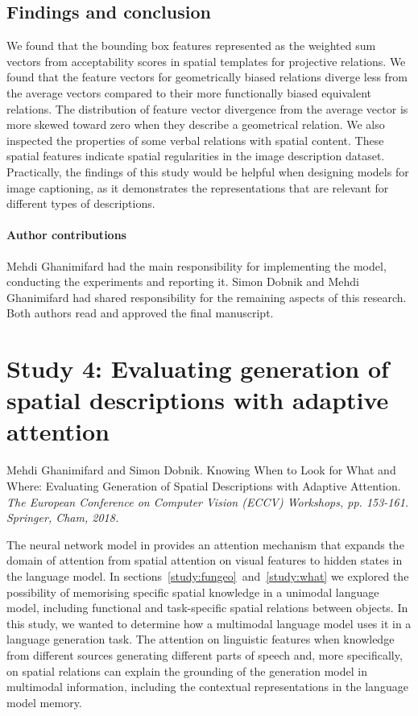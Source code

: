 \subsection{Findings and conclusion}
We found that the bounding box features %
represented as the
weighted sum vectors from acceptability scores in spatial templates for projective relations. 
We found that the feature vectors for geometrically biased relations diverge less from the average vectors compared to their more functionally biased equivalent relations. 
The distribution of feature vector divergence from the average vector is more skewed toward zero when they describe a geometrical relation. 
We also inspected the properties of some verbal relations with spatial content. 
These spatial features indicate spatial regularities in the image description dataset.
Practically, the findings of this study would be helpful when designing models for image captioning, as it demonstrates the representations that are relevant for different types of descriptions.

\paragraph{Author contributions}
Mehdi Ghanimifard had the main responsibility for implementing the model, conducting the experiments and reporting it. Simon Dobnik and Mehdi Ghanimifard had shared responsibility for the remaining aspects of this research. Both authors read and approved the final manuscript.

\section{Study 4: Evaluating generation of spatial descriptions with adaptive attention}
\label{study:knowing}
Mehdi Ghanimifard and Simon Dobnik. 
Knowing When to Look for What and Where: Evaluating Generation of Spatial Descriptions with Adaptive Attention.
\textit{The European Conference on Computer Vision (ECCV) Workshops, pp. 153-161. Springer, Cham, 2018.}

The neural network model in \citep{lu2017knowing} provides an attention mechanism that expands the domain of attention from spatial attention on visual features to hidden states in the language model. 
In sections~\ref{study:fungeo}~and~\ref{study:what} we explored the possibility of memorising specific spatial knowledge in a unimodal language model, including functional and task-specific spatial relations between objects. 
In this study, we wanted to determine how a multimodal language model uses it in a language generation task. 
The attention on linguistic features when knowledge from different sources generating different parts of speech and,
more specifically, on spatial relations can explain the grounding of the generation model in multimodal information, including the contextual representations in the language model memory. 

